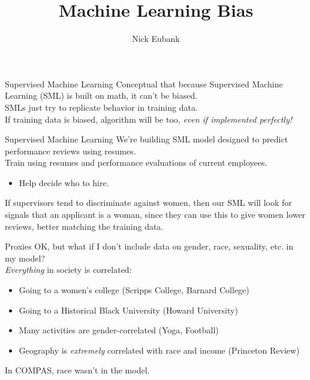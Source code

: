\documentclass[11pt]{beamer}
\title{Machine Learning Bias}
\author{\small Nick Eubank}
\date{\vspace*{.3in} \date}
\begin{document}
\begin{frame}
\maketitle
\end{frame}

\begin{frame}[c]{Supervised Machine Learning}
  Conceptual that because Supervised Machine Learning (SML) is built on math, it can't be biased. \\
  SMLs just try to \alert{replicate behavior in training data}. \\
  \pause
  \vspace{0.1cm}
  If training data is biased, algorithm will be too, \emph{even if implemented perfectly!}
\end{frame}

\begin{frame}[c]{Supervised Machine Learning}
  We're building SML model designed to predict performance reviews using resumes.\\
  \pause Train using resumes and performance evaluations of current employees.
  \begin{itemize}
    \pause \item Help decide who to hire.
  \end{itemize}
  \pause
  \vspace{0.1cm}
  If supervisors tend to discriminate against women, then our SML will \alert{look for signals that an applicant is a woman}, since they can use this to give women lower reviews, better matching the training data.
\end{frame}

\begin{frame}[c]{Proxies}
  OK, but what if I don't include data on gender, race, sexuality, etc. in my model? \\
  \vspace{0.1cm}
  \emph{Everything} in society is correlated:
  \begin{itemize}
    \pause \item Going to a women's college (Scripps College, Barnard College)
    \pause \item Going to a Historical Black University (Howard University)
    \pause \item Many activities are gender-correlated (Yoga, Football)
    \pause \item Geography is \emph{extremely} correlated with race and income (Princeton Review)
  \end{itemize}
  \pause In COMPAS, \alert{race wasn't in the model}.
\end{frame}
\end{document}
